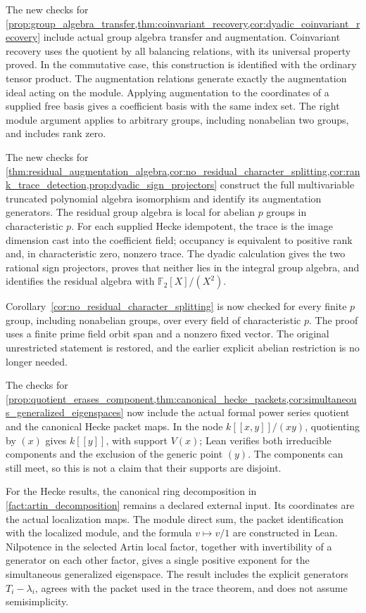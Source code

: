 \documentclass[11pt]{amsart}
\theoremstyle{definition}
\theoremstyle{remark}
\newcommand{\FF}{\mathbb F}
\begin{document}
The new checks for \cref{prop:group_algebra_transfer,thm:coinvariant_recovery,cor:dyadic_coinvariant_recovery} include actual group algebra transfer and augmentation. Coinvariant recovery uses the quotient by all balancing relations, with its universal property proved. In the commutative case, this construction is identified with the ordinary tensor product. The augmentation relations generate exactly the augmentation ideal acting on the module. Applying augmentation to the coordinates of a supplied free basis gives a coefficient basis with the same index set. The right module argument applies to arbitrary groups, including nonabelian two groups, and includes rank zero.

The new checks for \cref{thm:residual_augmentation_algebra,cor:no_residual_character_splitting,cor:rank_trace_detection,prop:dyadic_sign_projectors} construct the full multivariable truncated polynomial algebra isomorphism and identify its augmentation generators. The residual group algebra is local for abelian \(p\) groups in characteristic \(p\). For each supplied Hecke idempotent, the trace is the image dimension cast into the coefficient field; occupancy is equivalent to positive rank and, in characteristic zero, nonzero trace. The dyadic calculation gives the two rational sign projectors, proves that neither lies in the integral group algebra, and identifies the residual algebra with \(\FF_2[X]/(X^2)\).

Corollary~\ref{cor:no_residual_character_splitting} is now checked for every finite \(p\) group, including nonabelian groups, over every field of characteristic \(p\). The proof uses a finite prime field orbit span and a nonzero fixed vector. The original unrestricted statement is restored, and the earlier explicit abelian restriction is no longer needed.

The checks for \cref{prop:quotient_erases_component,thm:canonical_hecke_packets,cor:simultaneous_generalized_eigenspaces} now include the actual formal power series quotient and the canonical Hecke packet maps. In the node \(k[[x,y]]/(xy)\), quotienting by \((x)\) gives \(k[[y]]\), with support \(V(x)\); Lean verifies both irreducible components and the exclusion of the generic point \((y)\). The components can still meet, so this is not a claim that their supports are disjoint.

For the Hecke results, the canonical ring decomposition in \cref{fact:artin_decomposition} remains a declared external input. Its coordinates are the actual localization maps. The module direct sum, the packet identification with the localized module, and the formula \(v\mapsto v/1\) are constructed in Lean. Nilpotence in the selected Artin local factor, together with invertibility of a generator on each other factor, gives a single positive exponent for the simultaneous generalized eigenspace. The result includes the explicit generators \(T_i-\lambda_i\), agrees with the packet used in the trace theorem, and does not assume semisimplicity.
\end{document}
